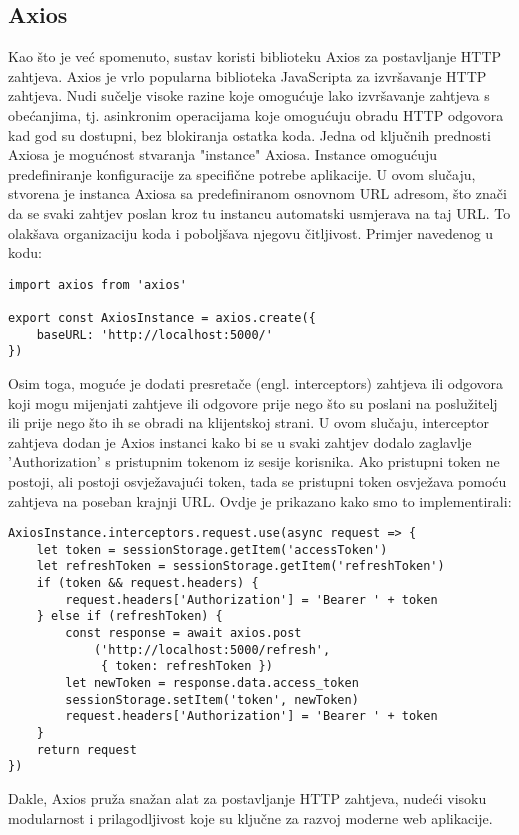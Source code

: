 \documentclass[times, utf8, zavrsni]{fer}
\begin{document}
\subsection{Axios}
Kao što je već spomenuto, sustav koristi biblioteku Axios za postavljanje HTTP zahtjeva. Axios je vrlo popularna biblioteka JavaScripta za izvršavanje HTTP zahtjeva. Nudi sučelje visoke razine koje omogućuje lako izvršavanje zahtjeva s obećanjima, tj. asinkronim operacijama koje omogućuju obradu HTTP odgovora kad god su dostupni, bez blokiranja ostatka koda. Jedna od ključnih prednosti Axiosa je mogućnost stvaranja "instance" Axiosa. Instance omogućuju predefiniranje konfiguracije za specifične potrebe aplikacije. U ovom slučaju, stvorena je instanca Axiosa sa predefiniranom osnovnom URL adresom, što znači da se svaki zahtjev poslan kroz tu instancu automatski usmjerava na taj URL. To olakšava organizaciju koda i poboljšava njegovu čitljivost. Primjer navedenog u kodu:
\begin{verbatim}
import axios from 'axios'

export const AxiosInstance = axios.create({ 
    baseURL: 'http://localhost:5000/'
})
\end{verbatim}
Osim toga, moguće je dodati presretače (engl. interceptors) zahtjeva ili odgovora koji mogu mijenjati zahtjeve ili odgovore prije nego što su poslani na poslužitelj ili prije nego što ih se obradi na klijentskoj strani. U ovom slučaju, interceptor zahtjeva dodan je Axios instanci kako bi se u svaki zahtjev dodalo zaglavlje 'Authorization' s pristupnim tokenom iz sesije korisnika. Ako pristupni token ne postoji, ali postoji osvježavajući token, tada se pristupni token osvježava pomoću zahtjeva na poseban krajnji URL. Ovdje je prikazano kako smo to implementirali:

\begin{verbatim}
AxiosInstance.interceptors.request.use(async request => {
    let token = sessionStorage.getItem('accessToken')
    let refreshToken = sessionStorage.getItem('refreshToken')
    if (token && request.headers) {
        request.headers['Authorization'] = 'Bearer ' + token
    } else if (refreshToken) {
        const response = await axios.post
            ('http://localhost:5000/refresh', 
             { token: refreshToken })
        let newToken = response.data.access_token
        sessionStorage.setItem('token', newToken)
        request.headers['Authorization'] = 'Bearer ' + token
    }
    return request
})
\end{verbatim}
Dakle, Axios pruža snažan alat za postavljanje HTTP zahtjeva, nudeći visoku modularnost i prilagodljivost koje su ključne za razvoj moderne web aplikacije.
\end{document}

